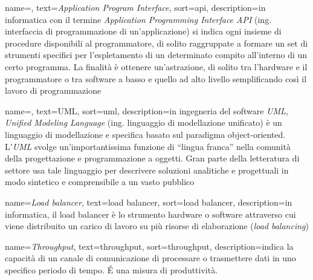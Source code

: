 
\renewcommand{\acronymname}{Acronimi e abbreviazioni}




\renewcommand{\glossaryname}{Glossario}

{
    name=,
    text=\emph{Application Program Interface},
    sort=api,
    description={in informatica con il termine \emph{Application Programming Interface API} (ing. interfaccia di programmazione di un'applicazione) si indica ogni insieme di procedure disponibili al programmatore, di solito raggruppate a formare un set di strumenti specifici per l'espletamento di un determinato compito all'interno di un certo programma. La finalità è ottenere un'astrazione, di solito tra l'hardware e il programmatore o tra software a basso e quello ad alto livello semplificando così il lavoro di programmazione}
}

{
    name=,
    text=UML,
    sort=uml,
    description={in ingegneria del software \emph{UML, Unified Modeling Language} (ing. linguaggio di modellazione unificato) è un linguaggio di modellazione e specifica basato sul paradigma object-oriented. L'\emph{UML} svolge un'importantissima funzione di ``lingua franca'' nella comunità della progettazione e programmazione a oggetti. Gran parte della letteratura di settore usa tale linguaggio per descrivere soluzioni analitiche e progettuali in modo sintetico e comprensibile a un vasto pubblico}
}

{
  name=\emph{Load balancer},
  text=load balancer,
  sort=load balancer,
  description={in informatica, il load balancer è lo strumento hardware o software attraverso cui viene distribuito un carico di lavoro su più risorse di elaborazione (\textit{load balancing})}
}

{
  name=\emph{Throughput},
  text=throughput,
  sort=throughput,
  description={indica la capacità di un canale di comunicazione di processare o trasmettere dati in uno specifico periodo di tempo. É una misura di produttività.}
}


